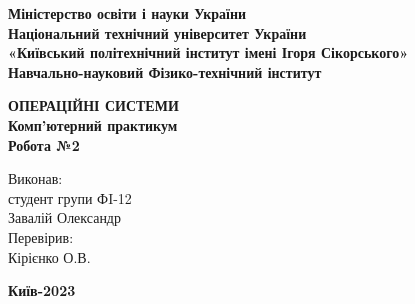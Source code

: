 \documentclass[a4paper,12pt]{article}
\begin{document}
    \pagestyle{fancy}
    \fancyhead{}
    \begin{center}
        \large{\textbf{Міністерство освіти і науки України\\
                Національний технічний університет України\\
                «Київський політехнічний інститут імені Ігоря Сікорського»\\
                Навчально-науковий Фізико-технічний інститут}}\\
        \hfill \break \hfill \break \hfill\break \hfill \break \hfill \break \hfill \break \hfill \break
        \hfill \break \hfill \break \hfill \break
        \begin{center}
            \normalsize{\textbf{ОПЕРАЦІЙНІ СИСТЕМИ\\
            Комп’ютерний практикум\\
            Робота №2}}
        \end{center}
    \end{center}
    \hfill \break \hfill \break \hfill \break \hfill \break \hfill \break \hfill \break \hfill \break
    \hfill \break \hfill \break \hfill \break \hfill \break 
    \begin{flushright}
        \large{ \hspace{35pt} Виконав:\\
            студент групи ФI-12\\
            Завалій Олександр\\} 
        \large{ \hspace{35pt} Перевірив:\\
        Кірієнко О.В.} 
    \end{flushright}
    \hfill \break \hfill \break \hfill \break \hfill \break \hfill \break \hfill \break \hfill \break
    \hfill \break
    \begin{center} \textbf{Київ-2023} \end{center}
    \thispagestyle{empty}
\end{document}
